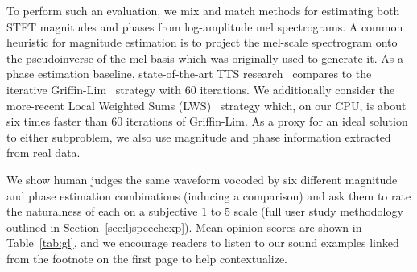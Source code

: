 \documentclass[a4paper]{article}
\begin{document}
To perform such an evaluation, we mix and match methods for estimating both STFT magnitudes and phases from log-amplitude mel spectrograms. 
A common heuristic for magnitude estimation is to project the mel-scale spectrogram onto the pseudoinverse of the mel basis which was originally used to generate it. 
As a phase estimation baseline, state-of-the-art TTS research~\cite{ping2017deep,shen2018natural} compares to the iterative Griffin-Lim~\cite{griffinlim} strategy with $60$ iterations. 
We additionally consider the more-recent Local Weighted Sums (LWS)~\cite{lws} strategy which, on our CPU, is about six times faster than $60$ iterations of Griffin-Lim.
As a proxy for an ideal solution to either subproblem, 
we also use magnitude and phase information extracted from real data. 

We show human judges the same waveform vocoded by six different magnitude and phase estimation combinations (inducing a comparison) and ask them to rate the naturalness of each on a subjective $1$ to $5$ scale (full user study methodology outlined in Section~\ref{sec:ljspeechexp}). 
Mean opinion scores are shown in Table~\ref{tab:gl}, and we encourage readers to listen to our sound examples linked from the footnote on the first page to help contextualize.
\end{document}
